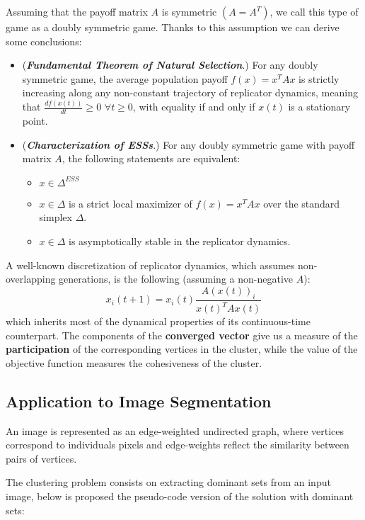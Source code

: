 Assuming that the payoff matrix $A$ is symmetric $(A = A^T)$, we call this type of game as a doubly symmetric game. Thanks to this assumption we can derive some conclusions:
\begin{itemize}
	\item (\textbf{\textit{Fundamental Theorem of Natural Selection}}.) For any doubly symmetric game, the average population payoff $f(x) = x^TAx$ is strictly increasing along any non-constant trajectory of replicator dynamics, meaning that $\frac{df(x(t))}{dt} \geq 0$ $\forall t \geq0$, with equality if and only if $x(t)$ is a stationary point.
	\item (\textit{\textbf{Characterization of ESSs}}.) For any doubly symmetric game with payoff matrix $A$, the following statements are equivalent:
	\begin{itemize}
		\item $x\in \Delta^{ESS}$
		\item $x \in \Delta$ is a strict local maximizer of $f(x) = x^TAx$ over the standard simplex $\Delta$.
		\item $x\in\Delta$ is asymptotically stable in the replicator dynamics.
	\end{itemize}
\end{itemize}


A well-known discretization of replicator dynamics, which assumes non-overlapping generations, is the following (assuming a non-negative $A$): 
$$
x_i(t+1) = x_i(t)\frac{A(x(t))_i}{x(t)^TAx(t)}
$$
which inherits most of the dynamical properties of its continuous-time counterpart.
The components of the \textbf{converged vector} give us a measure of the \textbf{participation} of the corresponding vertices in the cluster, while the value of the objective function measures the cohesiveness of the cluster.

\subsection{Application to Image Segmentation}
An image is represented as an edge-weighted undirected graph, where vertices correspond to individuals pixels and edge-weights reflect the similarity between pairs of vertices.

The clustering problem consists on extracting dominant sets from an input image, below is proposed the pseudo-code version of the solution with dominant sets:

